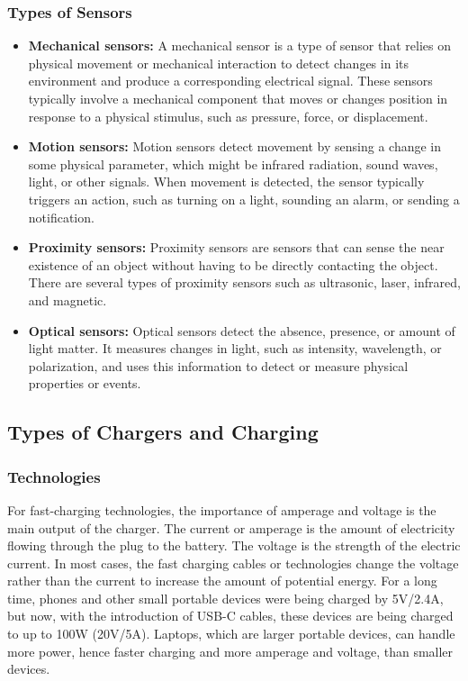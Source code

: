 \documentclass{article}
\begin{document}
\subsubsection{Types of Sensors}
\begin{itemize}

\item \textbf{Mechanical sensors:} A mechanical sensor is a type of sensor that relies on physical movement or mechanical interaction to detect changes in its environment and produce a corresponding electrical signal. These sensors typically involve a mechanical component that moves or changes position in response to a physical stimulus, such as pressure, force, or displacement. 
\item \textbf{Motion sensors:} Motion sensors detect movement by sensing a change in some physical parameter, which might be infrared radiation, sound waves, light, or other signals. When movement is detected, the sensor typically triggers an action, such as turning on a light, sounding an alarm, or sending a notification.
\item \textbf{Proximity sensors:} Proximity sensors are sensors that can sense the near existence of an object without having to be directly contacting the object. There are several types of proximity sensors such as ultrasonic, laser, infrared, and magnetic. 
\item \textbf{Optical sensors:} Optical sensors detect the absence, presence, or amount of light matter. It measures changes in light, such as intensity, wavelength, or polarization, and uses this information to detect or measure physical properties or events. 

\cite{dailysensors2021}
\cite{huang2023}
\cite{sensors2017}
    
\end{itemize}

\subsection{Types of Chargers and Charging}
\subsubsection{Technologies}
For fast-charging technologies, the importance of amperage and voltage is the main output of the charger. The current or amperage is the amount of electricity flowing through the plug to the battery. The voltage is the strength of the electric current. In most cases, the fast charging cables or technologies change the voltage rather than the current to increase the amount of potential energy. For a long time, phones and other small portable devices were being charged by 5V/2.4A, but now, with the introduction of USB-C cables, these devices are being charged to up to 100W (20V/5A). Laptops, which are larger portable devices, can handle more power, hence faster charging and more amperage and voltage, than smaller devices. 
\cite{fastchargers}
\end{document}

